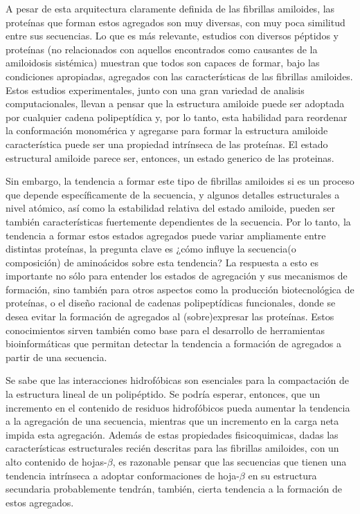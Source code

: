 A pesar de esta arquitectura claramente definida de las fibrillas amiloides, las proteínas que forman estos agregados son muy diversas, con muy poca similitud entre sus secuencias.
Lo que es más relevante, estudios con diversos péptidos y proteínas (no relacionados con aquellos encontrados como causantes de la amiloidosis sistémica) muestran que todos son capaces de formar, 
bajo las condiciones apropiadas, agregados con las características de las fibrillas amiloides.
Estos estudios experimentales, junto con una gran variedad de analisis computacionales, llevan a pensar que la estructura amiloide puede ser adoptada por cualquier cadena polipeptídica y, por lo tanto, 
esta habilidad para reordenar la conformación monomérica y agregarse para formar la estructura amiloide característica puede ser una propiedad intrínseca de las proteínas\cite{fandrich2002behaviour}.
El estado estructural amiloide parece ser, entonces, un estado generico de las proteinas.

Sin  embargo, la tendencia a formar este tipo de fibrillas amiloides si es un proceso que depende específicamente de la secuencia, y algunos detalles estructurales a nivel atómico, 
así como la estabilidad relativa del estado amiloide, pueden ser también características fuertemente dependientes de la secuencia. %
Por lo tanto, la tendencia a formar estos estados agregados puede variar ampliamente entre distintas proteínas, la pregunta clave es ¿cómo influye la secuencia(o composición) de aminoácidos sobre esta tendencia?
La respuesta a esto es importante no sólo para entender los estados de agregación y sus mecanismos de formación, sino también para otros aspectos como 
la producción biotecnológica de proteínas, o el diseño racional de cadenas polipeptídicas funcionales, donde se desea evitar la formación de agregados al (sobre)expresar las proteínas.
Estos conocimientos sirven también como base para el desarrollo de herramientas bioinformáticas que permitan detectar la tendencia a formación de agregados a partir de una secuencia.

Se sabe que las interacciones hidrofóbicas son esenciales para la compactación de la estructura lineal de un polipéptido.
Se podría esperar, entonces, que un incremento en el contenido de residuos hidrofóbicos pueda aumentar la tendencia a la agregación de una secuencia, mientras que un incremento en la carga neta impida esta agregación. 
Además de estas propiedades fisicoquimicas, dadas las características estructurales recién descritas para las fibrillas amiloides, con un alto contenido de hojas-$\beta$, 
es razonable pensar que las secuencias que tienen una tendencia intrínseca a adoptar conformaciones de hoja-$\beta$ en su estructura secundaria probablemente tendrán, también, cierta tendencia a la formación de estos agregados.  


